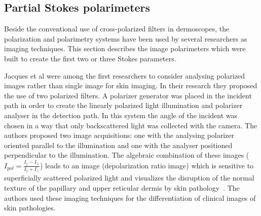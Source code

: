 \subsection{Partial Stokes polarimeters}
Beside the conventional use of cross-polarized filters in dermoscopes, the polarization and polarimetry systems have been used by several researchers as imaging techniques.
This section describes the image polarimeters which were built to create the first two or three Stokes parameters.
	
Jacques et al \cite{Jacques12175282} were among the first researchers to consider analysing polarized images rather than single image for skin imaging.
In their research they proposed the use of two polarized filters.
A polarizer generator was placed in the incident path in order to create the linearly polarized light illumination and polarizer analyser in the detection path.
In this system the angle of the incident was chosen in a way that only backscattered light was collected with the camera.
The authors proposed two image acquisitions: one with the analysing polarizer oriented parallel to the illumination and one with the analyser positioned perpendicular to the illumination.
The algebraic combination of these images ($I_{pol} = \frac{I_{\parallel}-I_{\perp}}{I_{\parallel}+I_{\perp}}$) leads to an image (depolarization ratio image) which is sensitive to superficially scattered polarized light and visualizes the disruption of the normal texture of the papillary and upper reticular dermis by skin pathology~\cite{Jacques12175282}. 
The authors used these imaging techniques for the differentiation of clinical images of skin pathologies. 

